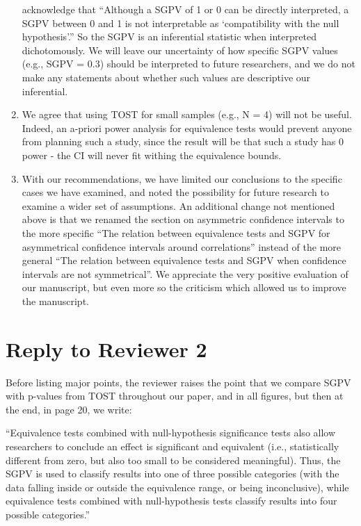 \documentclass[man]{apa6}
\begin{document}
\begin{enumerate}
  acknowledge that \enquote{Although a SGPV of 1 or 0 can be directly
  interpreted, a SGPV between 0 and 1 is not interpretable as
  \enquote{compatibility with the null hypothesis}.} So the SGPV is an
  inferential statistic when interpreted dichotomously. We will leave
  our uncertainty of how specific SGPV values (e.g., SGPV = 0.3) should
  be interpreted to future researchers, and we do not make any
  statements about whether such values are descriptive our inferential.
\item
  We agree that using TOST for small samples (e.g., N = 4) will not be
  useful. Indeed, an a-priori power analysis for equivalence tests would
  prevent anyone from planning such a study, since the result will be
  that such a study has 0 power - the CI will never fit withing the
  equivalence bounds.
\item
  With our recommendations, we have limited our conclusions to the
  specific cases we have examined, and noted the possibility for future
  research to examine a wider set of assumptions. An additional change
  not mentioned above is that we renamed the section on asymmetric
  confidence intervals to the more specific \enquote{The relation
  between equivalence tests and SGPV for asymmetrical confidence
  intervals around correlations} instead of the more general
  \enquote{The relation between equivalence tests and SGPV when
  confidence intervals are not symmetrical}. We appreciate the very
  positive evaluation of our manuscript, but even more so the criticism
  which allowed us to improve the manuscript.
\end{enumerate}

\section{Reply to Reviewer 2}\label{reply-to-reviewer-2}

Before listing major points, the reviewer raises the point that we
compare SGPV with p-values from TOST throughout our paper, and in all
figures, but then at the end, in page 20, we write:

\enquote{Equivalence tests combined with null-hypothesis significance
tests also allow researchers to conclude an effect is significant and
equivalent (i.e., statistically different from zero, but also too small
to be considered meaningful). Thus, the SGPV is used to classify results
into one of three possible categories (with the data falling inside or
outside the equivalence range, or being inconclusive), while equivalence
tests combined with null-hypothesis tests classify results into four
possible categories.}
\end{document}
